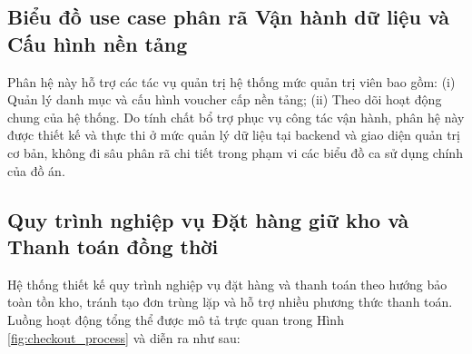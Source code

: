 \documentclass[../DoAn.tex]{subfiles}
\begin{document}
\subsection{Biểu đồ use case phân rã Vận hành dữ liệu và Cấu hình nền tảng}
\label{subsection:2.2.5}
Phân hệ này hỗ trợ các tác vụ quản trị hệ thống mức quản trị viên bao gồm: (i) Quản lý danh mục và cấu hình voucher cấp nền tảng; (ii) Theo dõi hoạt động chung của hệ thống. Do tính chất bổ trợ phục vụ công tác vận hành, phân hệ này được thiết kế và thực thi ở mức quản lý dữ liệu tại backend và giao diện quản trị cơ bản, không đi sâu phân rã chi tiết trong phạm vi các biểu đồ ca sử dụng chính của đồ án.

\subsection{Quy trình nghiệp vụ Đặt hàng giữ kho và Thanh toán đồng thời}
\label{subsection:2.2.6}
Hệ thống thiết kế quy trình nghiệp vụ đặt hàng và thanh toán theo hướng bảo toàn tồn kho, tránh tạo đơn trùng lặp và hỗ trợ nhiều phương thức thanh toán. Luồng hoạt động tổng thể được mô tả trực quan trong Hình \ref{fig:checkout_process} và diễn ra như sau:
\end{document}
